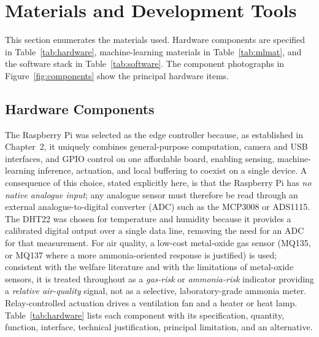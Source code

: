 \documentclass[12pt,a4paper]{report}
\begin{document}
\section{Materials and Development Tools}

This section enumerates the materials used. Hardware components are specified in Table~\ref{tab:hardware}, machine-learning materials in Table~\ref{tab:mlmat}, and the software stack in Table~\ref{tab:software}. The component photographs in Figure~\ref{fig:components} show the principal hardware items.

\subsection{Hardware Components}

The Raspberry Pi was selected as the edge controller because, as established in Chapter~2, it uniquely combines general-purpose computation, camera and USB interfaces, and GPIO control on one affordable board, enabling sensing, machine-learning inference, actuation, and local buffering to coexist on a single device. A consequence of this choice, stated explicitly here, is that the Raspberry Pi has \emph{no native analogue input}; any analogue sensor must therefore be read through an external analogue-to-digital converter (ADC) such as the MCP3008 or ADS1115. The DHT22 was chosen for temperature and humidity because it provides a calibrated digital output over a single data line, removing the need for an ADC for that measurement. For air quality, a low-cost metal-oxide gas sensor (MQ135, or MQ137 where a more ammonia-oriented response is justified) is used; consistent with the welfare literature and with the limitations of metal-oxide sensors, it is treated throughout as a \emph{gas-risk} or \emph{ammonia-risk} indicator providing a \emph{relative air-quality} signal, not as a selective, laboratory-grade ammonia meter. Relay-controlled actuation drives a ventilation fan and a heater or heat lamp. Table~\ref{tab:hardware} lists each component with its specification, quantity, function, interface, technical justification, principal limitation, and an alternative.
\end{document}
